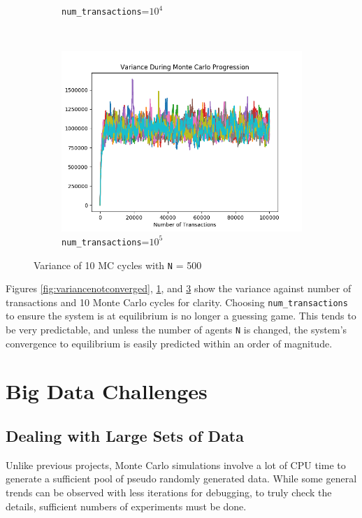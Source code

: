 \documentclass[12pt]{article} %
\begin{document}
\begin{figure}
\begin{subfigure}{0.5\textwidth}
		\caption{\texttt{num\_transactions}=$10^4$}
		\label{fig:varianceconverged}
	\end{subfigure}\\[1ex]
	\begin{subfigure}{\textwidth}
		\centering
		\includegraphics[scale=\scaleVar]{variancefullyconverged.png}	
		\caption{\texttt{num\_transactions}=$10^5$}
		\label{fig:variancefullyconverged}
	\end{subfigure}
	\caption{Variance of 10 MC cycles with \texttt{N} = 500}
\end{figure}
Figures \ref{fig:variancenotconverged}, \ref{fig:varianceconverged}, and
\ref{fig:variancefullyconverged} show the variance against number of
transactions and 10 Monte Carlo cycles for clarity. Choosing
\texttt{num\_transactions} to ensure the system is at equilibrium is no longer
a guessing game. This tends to be very predictable, and unless the number of
agents \texttt{N} is changed, the system's convergence to equilibrium is easily
predicted within an order of magnitude.

\section{Big Data Challenges}
\subsection{Dealing with Large Sets of Data}
Unlike previous projects, Monte Carlo simulations involve a lot of CPU time to
generate a sufficient pool of pseudo randomly generated data. While some
general trends can be observed with less iterations for debugging, to truly
check the details, sufficient numbers of experiments must be done.
\end{document}
